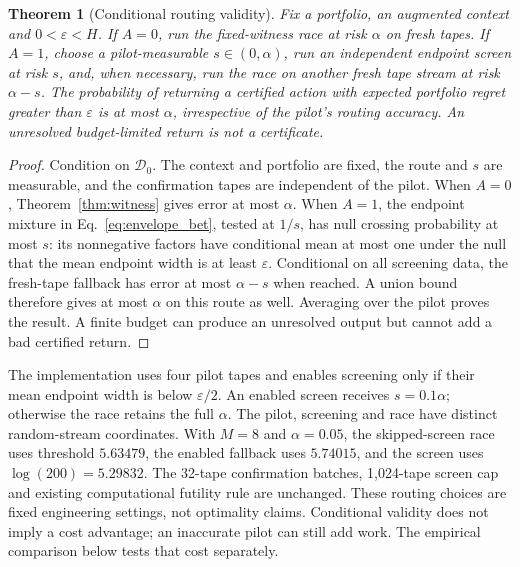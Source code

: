 \documentclass[preprint,11pt,sort&compress]{elsarticle}
\newtheorem{theorem}{Theorem}
\begin{document}
\begin{theorem}[Conditional routing validity]
\label{thm:conditional_routing}
Fix a portfolio, an augmented context and $0<\varepsilon<H$.
If $A=0$, run the fixed-witness race at risk $\alpha$ on fresh tapes.
If $A=1$, choose a pilot-measurable $s\in(0,\alpha)$, run an independent
endpoint screen at risk $s$, and, when necessary, run the race on another
fresh tape stream at risk $\alpha-s$. The probability of returning a
certified action with expected portfolio regret greater than
$\varepsilon$ is at most $\alpha$, irrespective of the pilot's routing
accuracy. An unresolved budget-limited return is not a certificate.
\end{theorem}
\begin{proof}
Condition on $\mathcal D_0$. The context and portfolio are fixed, the route
and $s$ are measurable, and the confirmation tapes are independent of the
pilot. When $A=0$, Theorem~\ref{thm:witness} gives error at most $\alpha$.
When $A=1$, the endpoint mixture in Eq.~\ref{eq:envelope_bet}, tested at
$1/s$, has null crossing probability at most $s$: its nonnegative factors
have conditional mean at most one under the null that the mean endpoint
width is at least $\varepsilon$. Conditional on all screening data, the
fresh-tape fallback has error at most $\alpha-s$ when reached. A union
bound therefore gives at most $\alpha$ on this route as well. Averaging
over the pilot proves the result. A finite budget can produce an unresolved
output but cannot add a bad certified return.
\end{proof}

The implementation uses four pilot tapes and enables screening only if
their mean endpoint width is below $\varepsilon/2$. An enabled screen
receives $s=0.1\alpha$; otherwise the race retains the full $\alpha$.
The pilot, screening and race have distinct random-stream coordinates.
With $M=8$ and $\alpha=0.05$, the skipped-screen race uses threshold
$5.63479$, the enabled fallback uses $5.74015$, and the screen uses
$\log(200)=5.29832$. The 32-tape confirmation batches, 1,024-tape screen cap
and existing computational futility rule are unchanged. These routing
choices are fixed engineering settings, not optimality claims. Conditional
validity does not imply a cost advantage; an inaccurate pilot can still
add work. The empirical comparison below tests that cost separately.
\end{document}
